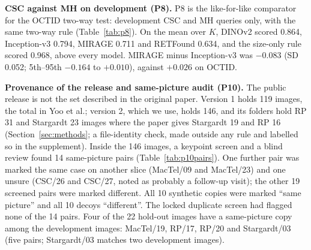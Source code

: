 \documentclass[conference]{IEEEtran}
\begin{document}
\textbf{CSC against MH on development (P8).} P8 is the like-for-like comparator for the OCTID two-way test: development CSC and MH queries only, with the same two-way rule (Table~\ref{tab:p8}). On the mean over $K$, DINOv2 scored 0.864, Inception-v3 0.794, MIRAGE 0.711 and RETFound 0.634, and the size-only rule scored 0.968, above every model. MIRAGE minus Inception-v3 was $-0.083$ (SD 0.052; 5th--95th $-0.164$ to $+0.010$), against $+0.026$ on OCTID.

\textbf{Provenance of the release and same-picture audit (P10).} The public release is not the set described in the original paper. Version 1 holds 119 images, the total in Yoo et al.; version 2, which we use, holds 146, and its folders hold RP 31 and Stargardt 23 images where the paper gives Stargardt 19 and RP 16 (Section~\ref{sec:methods}; a file-identity check, made outside any rule and labelled so in the supplement). Inside the 146 images, a keypoint screen and a blind review found 14 same-picture pairs (Table~\ref{tab:p10pairs}). One further pair was marked the same case on another slice (MacTel/09 and MacTel/23) and one unsure (CSC/26 and CSC/27, noted as probably a follow-up visit); the other 19 screened pairs were marked different. All 10 synthetic copies were marked ``same picture'' and all 10 decoys ``different''. The locked duplicate screen had flagged none of the 14 pairs. Four of the 22 hold-out images have a same-picture copy among the development images: MacTel/19, RP/17, RP/20 and Stargardt/03 (five pairs; Stargardt/03 matches two development images).
\end{document}
